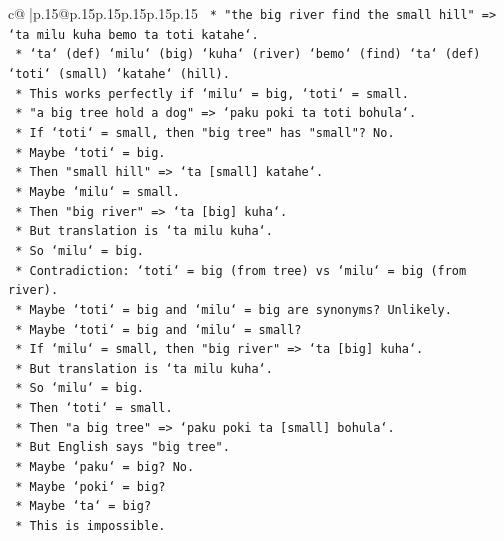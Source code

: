 \documentclass{article}
\begin{document}
{\begin{supertabular}{c@{$\;$}|p{.15\linewidth}@{}p{.15\linewidth}p{.15\linewidth}p{.15\linewidth}p{.15\linewidth}p{.15\linewidth}}
{{{\texttt{        *   "the big river find the small hill" => `ta milu kuha bemo ta toti katahe`.} \\
\texttt{            *   `ta` (def) `milu` (big) `kuha` (river) `bemo` (find) `ta` (def) `toti` (small) `katahe` (hill).} \\
\texttt{            *   This works perfectly if `milu` = big, `toti` = small.} \\
\texttt{        *   "a big tree hold a dog" => `paku poki ta toti bohula`.} \\
\texttt{            *   If `toti` = small, then "big tree" has "small"? No.} \\
\texttt{            *   Maybe `toti` = big.} \\
\texttt{            *   Then "small hill" => `ta {[}small{]} katahe`.} \\
\texttt{            *   Maybe `milu` = small.} \\
\texttt{            *   Then "big river" => `ta {[}big{]} kuha`.} \\
\texttt{            *   But translation is `ta milu kuha`.} \\
\texttt{            *   So `milu` = big.} \\
\texttt{            *   Contradiction: `toti` = big (from tree) vs `milu` = big (from river).} \\
\texttt{            *   Maybe `toti` = big and `milu` = big are synonyms? Unlikely.} \\
\texttt{            *   Maybe `toti` = big and `milu` = small?} \\
\texttt{            *   If `milu` = small, then "big river" => `ta {[}big{]} kuha`.} \\
\texttt{            *   But translation is `ta milu kuha`.} \\
\texttt{            *   So `milu` = big.} \\
\texttt{            *   Then `toti` = small.} \\
\texttt{            *   Then "a big tree" => `paku poki ta {[}small{]} bohula`.} \\
\texttt{            *   But English says "big tree".} \\
\texttt{            *   Maybe `paku` = big? No.} \\
\texttt{            *   Maybe `poki` = big?} \\
\texttt{            *   Maybe `ta` = big?} \\
\texttt{            *   This is impossible.} \\
}}}
\end{supertabular}}
\end{document}
